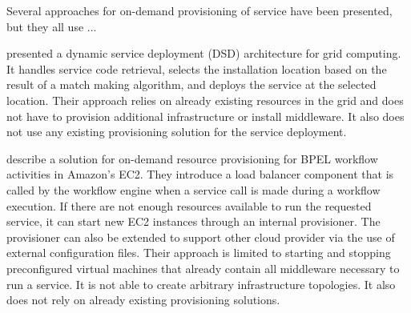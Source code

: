 Several approaches for on-demand provisioning of service have been presented, but they all use ...

\citeauthor*{applyingwebservice} presented a dynamic service deployment (DSD) architecture for grid computing.
It handles service code retrieval, selects the installation location based on the result of a match making algorithm, and deploys the service at the selected location.
Their approach relies on already existing resources in the grid and does not have to provision additional infrastructure or install middleware.
It also does not use any existing provisioning solution for the service deployment.

\citeauthor*{ondemandbpel} describe a solution for on-demand resource provisioning for BPEL workflow activities in Amazon's EC2.
They introduce a load balancer component that is called by the workflow engine when a service call is made during a workflow execution.
If there are not enough resources available to run the requested service,
it can start new EC2 instances through an internal provisioner.
The provisioner can also be extended to support other cloud provider via the use of external configuration files.
Their approach is limited to starting and stopping preconfigured virtual machines that already contain all middleware necessary to run a service.
It is not able to create arbitrary infrastructure topologies.
It also does not rely on already existing provisioning solutions.



